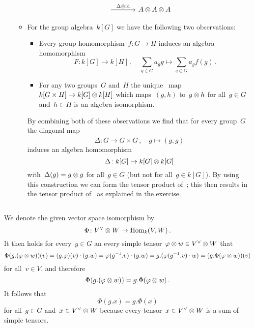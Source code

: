 \begin{remark}
\begin{enumerate}
\begin{itemize}
\[\begin{tikzcd}[sep = large]
                \arrow{r}[above]{\Delta \tensor \id}
              & A \tensor A \tensor A
            \end{tikzcd}
          \]
        \item
          For the group algebra~$k[G]$ we have the following two observations:
          \begin{itemize}
            \item
              Every group homomorphism~$f \colon G \to H$ induces an algebra homomorphism
              \[
                        F
                \colon  k[G]
                \to     k[H] \,,
                \quad   \sum_{g \in G} a_g g
                \mapsto \sum_{g \in G} a_g f(g) \,.
              \]
            \item
              For any two groups~$G$ and~$H$ the unique~{\klin} map~$k[G \times H] \to k[G] \otimes k[H]$ which maps~$(g,h)$ to~$g \otimes h$ for all~$g \in G$ and~$h \in H$ is an algebra isomorphism.
          \end{itemize}
          By combining both of these observations we find that for every group~$G$ the diagonal map
          \[
                    \tilde{\Delta}
            \colon  G
            \to     G \times G  \,,
            \quad   g
            \mapsto (g,g)
          \]
          induces an algebra homomorphism
          \[
                    \Delta
            \colon  k[G]
            \to     k[G] \otimes k[G]
          \]
          with~$\Delta(g) = g \otimes g$ for all~$g \in G$ (but not for all~$g \in k[G]$).
          By using this construction we can form the tensor product of~{};
          this then results in the tensor product of~{} as explained in the exercise.
      \end{itemize}
  \end{enumerate}
\end{remark}





\subsection{}


We denote the given vector space isomorphism by
\[
          \Phi
  \colon  V^\vee \otimes W
  \to     \operatorname{Hom}_k(V,W) \,.
\]
It then holds for every~$g \in G$ an every simple tensor~$\varphi \otimes w \in V^\vee \otimes W$ that
\[
    \Phi(g.(\varphi \otimes w))(v)
  = (g.\varphi)(v) \cdot (g.w)
  = \varphi(g^{-1}.v) \cdot (g.w)
  = g.(\varphi(g^{-1}.v) \cdot w)
  = (g.\Phi(\varphi \otimes w))(v)
\]
for all~$v \in V$, and therefore
\[
    \Phi(g.(\varphi \otimes w))
  = g.\Phi(\varphi \otimes w) \,.
\]
It follows that
\[
    \Phi(g.x)
  = g.\Phi(x)
\]
for all~$g \in G$ and~$x \in V^\vee \otimes W$ because every tensor~$x \in V^\vee \otimes W$ is a sum of simple tensors.





